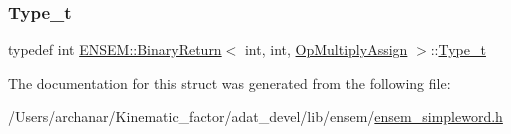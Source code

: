 \mbox{\label{structENSEM_1_1BinaryReturn_3_01int_00_01int_00_01OpMultiplyAssign_01_4_a7a8dcc18d85fb6a01288cb15f4bc4cdf}} 
\subsubsection{\texorpdfstring{Type\_t}{Type\_t}\hspace{0.1cm}{\footnotesize\ttfamily [2/2]}}
{\footnotesize\ttfamily typedef int \mbox{\hyperlink{structENSEM_1_1BinaryReturn}{E\+N\+S\+E\+M\+::\+Binary\+Return}}$<$ int, int, \mbox{\hyperlink{structENSEM_1_1OpMultiplyAssign}{Op\+Multiply\+Assign}} $>$\+::\mbox{\hyperlink{structENSEM_1_1BinaryReturn_3_01int_00_01int_00_01OpMultiplyAssign_01_4_a7a8dcc18d85fb6a01288cb15f4bc4cdf}{Type\+\_\+t}}}



The documentation for this struct was generated from the following file\+:\begin{DoxyCompactItemize}
\item 
/\+Users/archanar/\+Kinematic\+\_\+factor/adat\+\_\+devel/lib/ensem/\mbox{\hyperlink{lib_2ensem_2ensem__simpleword_8h}{ensem\+\_\+simpleword.\+h}}\end{DoxyCompactItemize}
